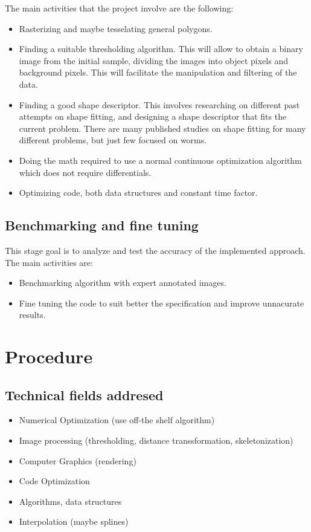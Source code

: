 \documentclass{article}
\begin{document}
The main activities that the project involve are the following:
\begin{itemize}
\item Rasterizing and maybe tesselating general polygons.
\item Finding a suitable thresholding algorithm. This will allow to obtain a 
binary image from the initial sample, dividing the images into
object pixels and background pixels. This will facilitate the manipulation 
and filtering of the data.
\item Finding a good shape descriptor. This involves researching on different
past attempts on shape fitting, and designing a shape descriptor that fits
the current problem. There are many published studies on shape fitting 
for many different problems, but just few focused on worms.
\item Doing the math required to use a normal continuous optimization algorithm
which does not require differentials.
\item Optimizing code, both data structures and constant time factor.
\end{itemize}

\subsection{Benchmarking and fine tuning}
This stage goal is to analyze and test the accuracy of the implemented
approach. The main activities are:

\begin{itemize}
\item Benchmarking algorithm with expert annotated images.
\item Fine tuning the code to suit better the specification and improve
  unnacurate results.
\end{itemize}

\section{Procedure}

\subsection{Technical fields addresed}
\begin{itemize}
\item Numerical Optimization (use off-the shelf algorithm)
\item Image processing (thresholding, distance transsformation, skeletonization)
\item Computer Graphics (rendering)
\item Code Optimization
\item Algorithms, data structures
\item Interpolation (maybe splines)
\end{itemize}
\end{document}
